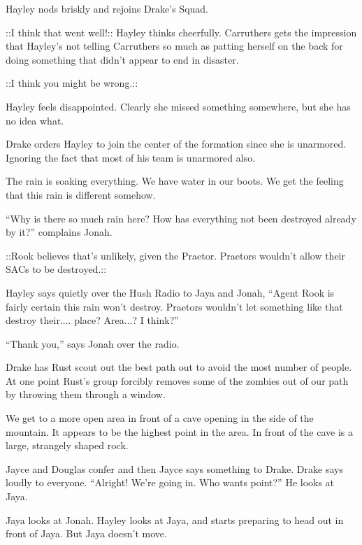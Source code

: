 Hayley nods briskly and rejoins Drake's Squad.

 {\color[RGB]{230,145,56}::I think that went well!::}  {\color[RGB]{255,153,0}  } Hayley thinks cheerfully.  Carruthers gets the impression that Hayley's not telling Carruthers so much as patting herself on the back for doing something that didn't appear to end in disaster.

 {\color[RGB]{153,0,255}::I think you might be wrong.::} 

Hayley feels disappointed.  Clearly she missed something somewhere, but she has no idea what.



Drake orders Hayley to join the center of the formation since she is unarmored.  Ignoring the fact that most of his team is unarmored also.

The rain is soaking everything.  We have water in our boots.  We get the feeling that this rain is different somehow.

``Why is there so much rain here? How has everything not been destroyed already by it?'' complains Jonah.

 {\color[RGB]{153,0,255}::Rook believes that's unlikely, given the Praetor.  Praetors wouldn't allow their SACs to be destroyed.::} 

Hayley says quietly over the Hush Radio to Jaya and Jonah, ``Agent Rook is fairly certain this rain won't destroy.  Praetors wouldn't let something like that destroy their.... place?  Area...?  I think?''

``Thank you,'' says Jonah over the radio.

Drake has Rust scout out the best path out to avoid the most number of people.  At one point Rust's group forcibly removes some of the zombies out of our path by throwing them through a window.  







We get to a more open area in front of a cave opening in the side of the mountain.  It appears to be the highest point in the area.  In front of the cave is a large, strangely shaped rock.

Jayce and Douglas confer and then Jayce says something to Drake.  Drake says loudly to everyone. ``Alright!  We're going in.  Who wants point?''  He looks at Jaya.

Jaya looks at Jonah.   Hayley looks at Jaya, and starts preparing to head out in front of Jaya.  But Jaya doesn't move.


